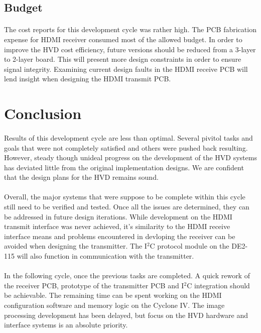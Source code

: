 \documentclass[pdftex,12pt,a4paper]{article}
\begin{document}
\subsection{Budget}

\paragraph{}
The cost reports for this development cycle was rather high. The PCB fabrication expense for HDMI receiver consumed most of the allowed budget. In order to improve the HVD cost efficiency, future versions should be reduced from a 3-layer to 2-layer board. This will present more design constraints in order to ensure signal integrity. Examining current design faults in the HDMI receive PCB will lend insight when designing the HDMI transmit PCB.

\section{Conclusion}

\paragraph{}
Results of this development cycle are less than optimal. Several pivitol tasks and goals that were not completely satisfied and others were pushed back resulting. However, steady though unideal progress on the development of the HVD systems has deviated little from the original implementation designs. We are confident that the design plans for the HVD remains sound.

\paragraph{}
Overall, the major systems that were suppose to be complete within this cycle still need to be verified and tested. Once all the issues are determined, they can be addressed in future design iterations. While development on the HDMI transmit interface was never achieved, it's similarity to the HDMI receive interface means and problems encountered in devloping the receiver can be avoided when designing the transmitter. The I$^2$C protocol module on the DE2-115 will also function in communication with the transmitter. 

\paragraph{}
In the following cycle, once the previous tasks are completed. A quick rework of the receiver PCB, prototype of the transmitter PCB and I$^2$C integration should be achievable. The remaining time can be spent working on the HDMI configuration software and memory logic on the Cyclone IV. The image processing development has been delayed, but focus on the HVD hardware and interface systems is an absolute priority.
\end{document}
